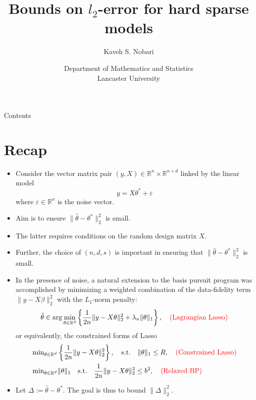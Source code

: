 \documentclass[10pt,handout,english]{beamer}
\title[]{Bounds on $l_2$-error for hard sparse models}
\author[Kaveh S. Nobari]{Kaveh S. Nobari}
\institute[]{Lectures in High-Dimensional Statistics}
\date[27/10/2020]
{Department of Mathematics and Statistics\\ Lancaster University}
\newcommand{\R}{\mathbb{R}}
\begin{document}
\begin{frame}
\titlepage
\end{frame}


\begin{frame}{Contents}
\tableofcontents
\end{frame}


\section{Recap}

\begin{frame}[allowframebreaks]
\begin{itemize}
\setlength\itemsep{0.5em}
\item Consider the vector matrix pair $(y,X)\in\R^n\times \R^{n\times d}$ linked by the linear model
\[
y=X\theta^*+\varepsilon
\]
where $\varepsilon \in \R^n$ is the noise vector.
\item Aim is to ensure $\lVert \hat{\theta}-\theta^*\rVert_2^2$ is small.\justifying
\item The latter requires conditions on the random design matrix $X$.\justifying
\item Further, the choice of $(n,d,s)$ is important in ensuring that $\lVert \hat{\theta}-\theta^*\rVert_2^2$ is small.\justifying 
\item In the presence of noise, a natural extension to the basis pursuit program was accomplished by minimizing a weighted combination of the data-fidelity  term $\lVert y-X\beta\rVert_2^2$ with the $L_1$-norm penalty:\justifying
\begin{equation}\label{eq: Lagrangian Lasso}
\hat{\theta}\in\arg\min_{\theta \in \R^d}\left\{\frac{1}{2n}\lVert y-X\theta\rVert_2^2+\lambda_n\lVert\theta\rVert_1\right\},\quad\text{\textcolor{red}{(Lagrangian Lasso)}}
\end{equation} 
or equivalently, the constrained forms of Lasso
\begingroup
\allowdisplaybreaks
\begin{align}
\min&_{\theta\in\R^d}\left\{\frac{1}{2n}\lVert y-X\theta\rVert_2^2\right\},\quad\text{s.t.}\quad \lVert\theta\rVert_1\leq R,\quad\text{\textcolor{red}{(Constrained Lasso)}}\label{eq: Constrained Lasso}\\
\min&_{\theta\in\R^d}\lVert\theta\rVert_1\quad\text{s.t.}\quad\frac{1}{2n}\lVert y-X\theta\rVert_2^2\leq b^2,\quad\text{\textcolor{red}{(Relaxed BP)}}\label{eq: RBP}
\end{align}
\endgroup
\item Let $\Delta:=\hat{\theta}-\theta^*$. The goal is thus to bound $\lVert\Delta\rVert_2^2$.\justifying 

\end{itemize}
\end{frame}
\end{document}
